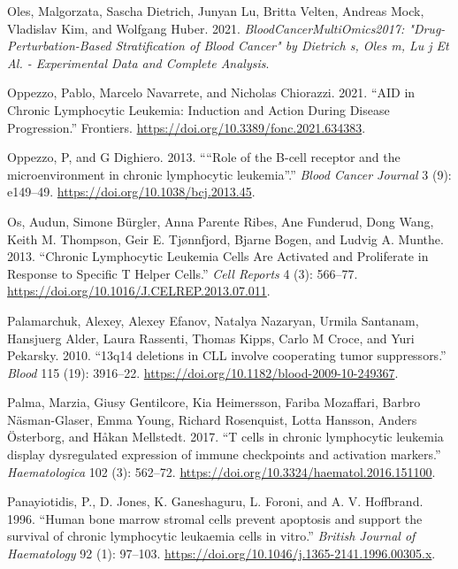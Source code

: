 \documentclass[11pt, a4paper, twosided]{book}
\newenvironment{CSLReferences}%
  {}%
  {\par}
\begin{document}
\begin{CSLReferences}{1}{0}
\leavevmode{}%
Oles, Malgorzata, Sascha Dietrich, Junyan Lu, Britta Velten, Andreas Mock, Vladislav Kim, and Wolfgang Huber. 2021. \emph{BloodCancerMultiOmics2017: "Drug-Perturbation-Based Stratification of Blood Cancer" by Dietrich s, Oles m, Lu j Et Al. - Experimental Data and Complete Analysis}.

\leavevmode{}%
Oppezzo, Pablo, Marcelo Navarrete, and Nicholas Chiorazzi. 2021. {``{AID in Chronic Lymphocytic Leukemia: Induction and Action During Disease Progression}.''} Frontiers. \url{https://doi.org/10.3389/fonc.2021.634383}.

\leavevmode{}%
Oppezzo, P, and G Dighiero. 2013. {``{``Role of the B-cell receptor and the microenvironment in chronic lymphocytic leukemia''}.''} \emph{Blood Cancer Journal} 3 (9): e149--49. \url{https://doi.org/10.1038/bcj.2013.45}.

\leavevmode{}%
Os, Audun, Simone Bürgler, Anna Parente Ribes, Ane Funderud, Dong Wang, Keith M. Thompson, Geir E. Tjønnfjord, Bjarne Bogen, and Ludvig A. Munthe. 2013. {``{Chronic Lymphocytic Leukemia Cells Are Activated and Proliferate in Response to Specific T Helper Cells}.''} \emph{Cell Reports} 4 (3): 566--77. \url{https://doi.org/10.1016/J.CELREP.2013.07.011}.

\leavevmode{}%
Palamarchuk, Alexey, Alexey Efanov, Natalya Nazaryan, Urmila Santanam, Hansjuerg Alder, Laura Rassenti, Thomas Kipps, Carlo M Croce, and Yuri Pekarsky. 2010. {``{13q14 deletions in CLL involve cooperating tumor suppressors}.''} \emph{Blood} 115 (19): 3916--22. \url{https://doi.org/10.1182/blood-2009-10-249367}.

\leavevmode{}%
Palma, Marzia, Giusy Gentilcore, Kia Heimersson, Fariba Mozaffari, Barbro Näsman-Glaser, Emma Young, Richard Rosenquist, Lotta Hansson, Anders Österborg, and Håkan Mellstedt. 2017. {``{T cells in chronic lymphocytic leukemia display dysregulated expression of immune checkpoints and activation markers}.''} \emph{Haematologica} 102 (3): 562--72. \url{https://doi.org/10.3324/haematol.2016.151100}.

\leavevmode{}%
Panayiotidis, P., D. Jones, K. Ganeshaguru, L. Foroni, and A. V. Hoffbrand. 1996. {``{Human bone marrow stromal cells prevent apoptosis and support the survival of chronic lymphocytic leukaemia cells in vitro}.''} \emph{British Journal of Haematology} 92 (1): 97--103. \url{https://doi.org/10.1046/j.1365-2141.1996.00305.x}.


\end{CSLReferences}
\end{document}
